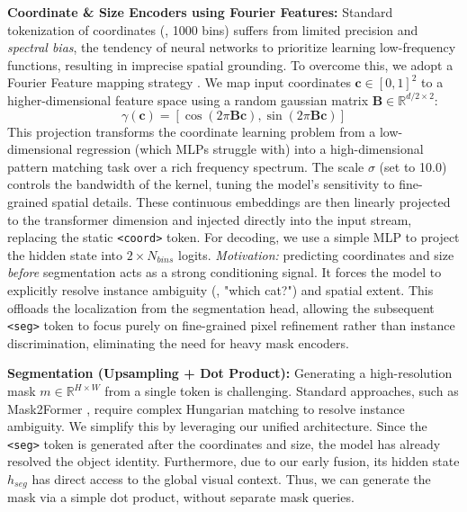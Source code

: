 \noindent \textbf{Coordinate \& Size Encoders using Fourier Features:} Standard tokenization of coordinates (\eg, 1000 bins) suffers from limited precision and \textit{spectral bias}, the tendency of neural networks to prioritize learning low-frequency functions, resulting in imprecise spatial grounding.  To overcome this, we adopt a Fourier Feature mapping strategy \citep{FourierFeat}.  We map input coordinates $\mathbf{c} \in [0,1]^2$ to a higher-dimensional feature space using a random gaussian matrix $\mathbf{B} \in \mathbb{R}^{d/2 \times 2}$:
\begin{equation}
\gamma(\mathbf{c}) = [\cos(2\pi \mathbf{B}\mathbf{c}), \sin(2\pi \mathbf{B}\mathbf{c})]
\end{equation}
This projection transforms the coordinate learning problem from a low-dimensional regression (which MLPs struggle with) into a high-dimensional pattern matching task over a rich frequency spectrum. The scale $\sigma$ (set to 10.0) controls the bandwidth of the kernel, tuning the model's sensitivity to fine-grained spatial details. These continuous embeddings are then linearly projected to the transformer dimension and injected directly into the input stream, replacing the static \texttt{<coord>} token. For decoding, we use a simple MLP to project the hidden state into $2 \times N_{bins}$ logits. \textit{Motivation:} predicting coordinates and size \textit{before} segmentation acts as a strong conditioning signal. It forces the model to explicitly resolve instance ambiguity (\eg, "which cat?") and spatial extent. This offloads the localization from the segmentation head, allowing the subsequent \texttt{<seg>} token to focus purely on fine-grained pixel refinement rather than instance discrimination, eliminating the need for heavy mask encoders.


\noindent \textbf{Segmentation (Upsampling + Dot Product):} Generating a high-resolution mask $m \in \mathbb{R}^{H \times W}$ from a single token is challenging. Standard approaches, such as Mask2Former \citep{cheng2022masked}, require complex Hungarian matching to resolve instance ambiguity. We simplify this by leveraging our unified architecture. Since the \texttt{<seg>} token is generated after the coordinates and size, the model has already resolved the object identity. Furthermore, due to our early fusion, its hidden state $h_{seg}$ has direct access to the global visual context. Thus, we can generate the mask via a simple dot product, without separate mask queries.

